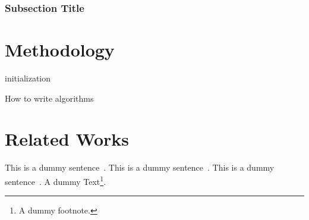 \documentclass[master]{NTHUthesis}
\begin{document}
\subsection{Subsection Title}
\lipsum[6]

\chapter{Methodology}
\lipsum[1-3]
\begin{algorithm}[t]
\SetAlgoLined
{}
 initialization\;
 \caption{How to write algorithms}
\end{algorithm}

\chapter{Related Works}

This is a dummy sentence~\cite{Alpher02}. This is a dummy sentence~\cite{Alpher03}. This is a dummy sentence~\cite{Alpher04}. A dummy Text\footnote{A dummy footnote.}.



\end{document}
